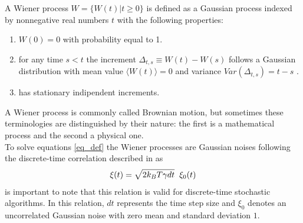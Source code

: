 A Wiener process $W = \{W(t)|t\geq 0\}$ is defined as a Gaussian process indexed by nonnegative real numbers $t$ with the following properties:
\begin{enumerate}
    \item $W(0)=0$ with probability equal to 1.
    \item for any time $s<t$ the increment $\Delta_{t,s} \equiv W(t)-W(s)$ follows a Gaussian distribution with mean value $\langle W(t) \rangle = 0$ and variance $Var(\Delta_{t,s}) = t-s$ .
    \item has stationary indipendent increments.
\end{enumerate}
A Wiener process is commonly called Brownian motion, but sometimes these terminologies are distinguished by their nature: the first is a mathematical process and the second a physical one.
\\
To solve equations \eqref{eq_def} the Wiener processes are Gaussian noises following the discrete-time correlation described in \cite{10.1063/5.0066008} as
\begin{equation}
    \xi(t) = \sqrt{2 k_BT \gamma dt} \hspace{0.2cm} \xi_{0}(t)
\end{equation}
is important to note that this relation is valid for discrete-time stochastic algorithms. In this relation, $dt$ represents the time step size and  $\xi_0$ denotes an uncorrelated Gaussian noise with zero mean and standard deviation $1$.
\newpage

